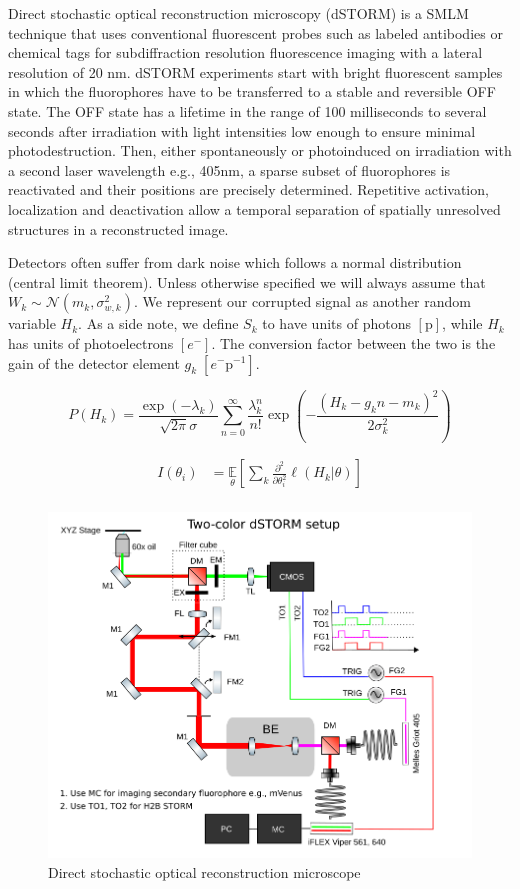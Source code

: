 \documentclass{article}
\begin{document}
Direct stochastic optical reconstruction microscopy (dSTORM) is a SMLM technique that uses conventional fluorescent probes such as labeled antibodies or chemical tags for subdiffraction resolution fluorescence imaging with a lateral resolution of 20 nm. dSTORM experiments start with bright fluorescent samples in which the fluorophores have to be transferred to a stable and reversible OFF state. The OFF state has a lifetime in the range of 100 milliseconds to several seconds after irradiation with light intensities low enough to ensure minimal photodestruction. Then, either spontaneously or photoinduced on irradiation with a second laser wavelength e.g., 405nm, a sparse subset of fluorophores is reactivated and their positions are precisely determined. Repetitive activation, localization and deactivation allow a temporal separation of spatially unresolved structures in a reconstructed image. 

Detectors often suffer from dark noise which follows a normal distribution (central limit theorem). Unless otherwise specified we will always assume that $W_{k} \sim \mathcal{N}(m_{k},\sigma_{w,k}^{2})$. We represent our corrupted signal as another random variable $H_{k}$. As a side note, we define $S_{k}$ to have units of photons $[\mathrm{p}]$, while $H_{k}$ has units of photoelectrons $[e^{-}]$. The conversion factor between the two is the gain of the detector element $g_{k}\; [e^{-}\mathrm{p}^{-1}]$. 
 
\begin{equation}
P(H_{k}) = \frac{\exp\left({-\lambda_{k}}\right)}{\sqrt{2\pi}\sigma}\sum_{n=0}^{\infty}\frac{\lambda_{k}^{n}}{n!}\exp\left(-\frac{(H_{k}-g_{k}n-m_{k})^{2}}{2\sigma_{k}^{2}}\right)
\end{equation} 
 
\begin{align*}
I(\theta_{i}) &= \underset{\theta}{\mathbb{E}}\left[\sum_{k}\frac{\partial^{2}}{\partial\theta_{i}^{2}}  \ell (H_{k}|\theta)\right]\\
\end{align*}

\begin{figure}
\centering
\includegraphics[width=12cm]{dSTORM.png}
\caption{Direct stochastic optical reconstruction microscope}
\end{figure}
\end{document}
